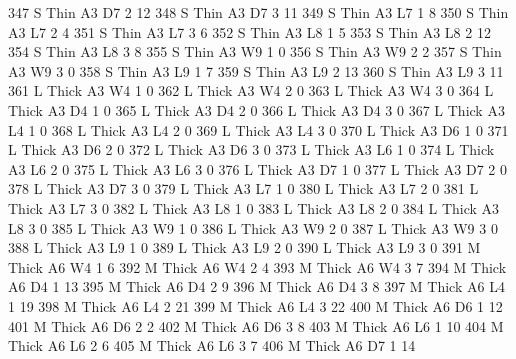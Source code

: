 \documentclass{article}
\begin{document}
\begin{Schunk}
\begin{Soutput}
347       S   Thin   A3      D7     2    12
348       S   Thin   A3      D7     3    11
349       S   Thin   A3      L7     1     8
350       S   Thin   A3      L7     2     4
351       S   Thin   A3      L7     3     6
352       S   Thin   A3      L8     1     5
353       S   Thin   A3      L8     2    12
354       S   Thin   A3      L8     3     8
355       S   Thin   A3      W9     1     0
356       S   Thin   A3      W9     2     2
357       S   Thin   A3      W9     3     0
358       S   Thin   A3      L9     1     7
359       S   Thin   A3      L9     2    13
360       S   Thin   A3      L9     3    11
361       L  Thick   A3      W4     1     0
362       L  Thick   A3      W4     2     0
363       L  Thick   A3      W4     3     0
364       L  Thick   A3      D4     1     0
365       L  Thick   A3      D4     2     0
366       L  Thick   A3      D4     3     0
367       L  Thick   A3      L4     1     0
368       L  Thick   A3      L4     2     0
369       L  Thick   A3      L4     3     0
370       L  Thick   A3      D6     1     0
371       L  Thick   A3      D6     2     0
372       L  Thick   A3      D6     3     0
373       L  Thick   A3      L6     1     0
374       L  Thick   A3      L6     2     0
375       L  Thick   A3      L6     3     0
376       L  Thick   A3      D7     1     0
377       L  Thick   A3      D7     2     0
378       L  Thick   A3      D7     3     0
379       L  Thick   A3      L7     1     0
380       L  Thick   A3      L7     2     0
381       L  Thick   A3      L7     3     0
382       L  Thick   A3      L8     1     0
383       L  Thick   A3      L8     2     0
384       L  Thick   A3      L8     3     0
385       L  Thick   A3      W9     1     0
386       L  Thick   A3      W9     2     0
387       L  Thick   A3      W9     3     0
388       L  Thick   A3      L9     1     0
389       L  Thick   A3      L9     2     0
390       L  Thick   A3      L9     3     0
391       M  Thick   A6      W4     1     6
392       M  Thick   A6      W4     2     4
393       M  Thick   A6      W4     3     7
394       M  Thick   A6      D4     1    13
395       M  Thick   A6      D4     2     9
396       M  Thick   A6      D4     3     8
397       M  Thick   A6      L4     1    19
398       M  Thick   A6      L4     2    21
399       M  Thick   A6      L4     3    22
400       M  Thick   A6      D6     1    12
401       M  Thick   A6      D6     2     2
402       M  Thick   A6      D6     3     8
403       M  Thick   A6      L6     1    10
404       M  Thick   A6      L6     2     6
405       M  Thick   A6      L6     3     7
406       M  Thick   A6      D7     1    14

\end{Soutput}
\end{Schunk}
\end{document}
